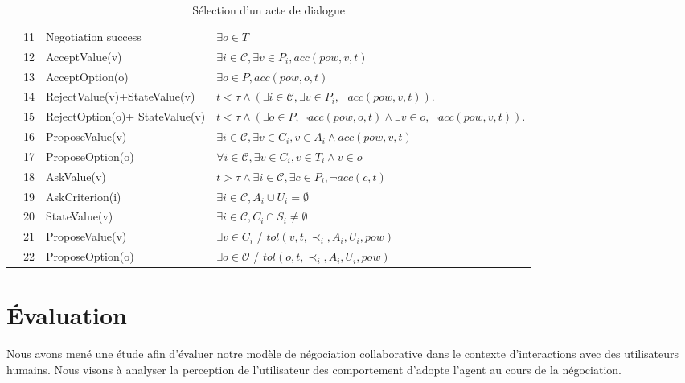 \begin{table*}[!t]
{\begin{tabular}{|p{.3cm}|p{.6cm}|p{3cm}|p{7.5cm}|}
						\hline
						
						\parbox[t]{2mm}{
							} & 11& Negotiation success &  $\exists o \in T$ \\
						&12& AcceptValue(v) & $\exists i\in\mathcal{C}, \exists v \in P_i, acc(pow, v, t)$ \\
						&13&AcceptOption(o) & $\exists o \in P, acc(pow, o, t)$ \\
						&14&RejectValue(v)+\newline StateValue(v) & $ t<\tau \land (\exists i\in\mathcal{C}, \exists v \in P_i, \neg acc(pow,v, t))$.\\
						&15&RejectOption(o)+ \newline StateValue(v) & $ t<\tau \land (\exists o \in P,  \neg acc(pow,o, t) \land \exists v \in o, \neg acc(pow,v, t))$.\\
						&16&ProposeValue(v) &  $\exists i\in\mathcal{C}, \exists v \in C_i, v \in A_i  \land acc(pow, v, t) $\\
						&17&ProposeOption(o)  & $\forall i\in\mathcal{C},\exists v \in C_i, v \in T_i  \land v \in o$ \\
						&18&AskValue(v) & $t > \tau \land \exists i\in\mathcal{C}, \exists c \in P_i, \neg acc(c, t)$ \\
						&19&AskCriterion(i) & $\exists i\in\mathcal{C}, A_i \cup U_i= \emptyset $\\
						&20&StateValue(v) & $\exists i\in\mathcal{C}, C_i\cap S_i \neq \emptyset$	\\
						&21& ProposeValue(v) & $\exists v \in C_i$ / $tol(v, t, \prec_i, A_i, U_i, pow)$\\
						&22& ProposeOption(o) & $\exists o \in \mathcal{O}$ / $tol(o, t, \prec_i, A_i, U_i, pow)$\\
						
						\hline
					\end{tabular}
				}
				\caption{Sélection d'un acte de dialogue}
				\label{table:uttChoice}
			\end{table*}
	
		
			\section{Évaluation}
			\label{sec:eval}
			Nous avons mené une étude afin d'évaluer notre modèle de négociation collaborative dans le contexte d'interactions avec des utilisateurs humains. Nous visons à analyser la perception de l'utilisateur des comportement d'adopte l'agent au cours de la négociation.
			
